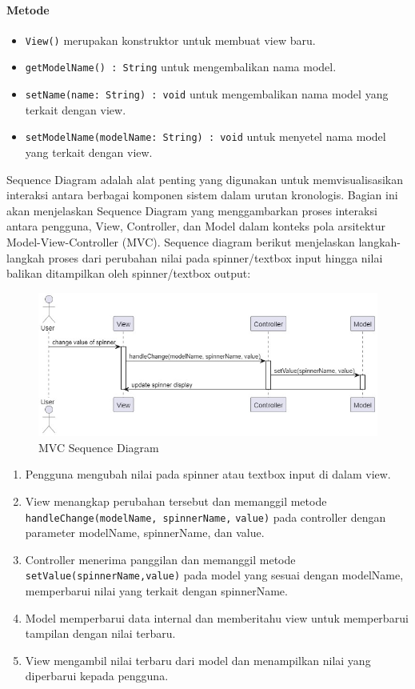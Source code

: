 \documentclass[conference]{IEEEtran}
\begin{document}
\paragraph{Metode} 
\begin{itemize}
\item \verb |View()| merupakan konstruktor untuk membuat view baru.
\item \verb |getModelName() : String| untuk mengembalikan nama model. 
\item \verb |setName(name: String) : void| untuk mengembalikan nama model yang terkait dengan view.
\item \verb |setModelName(modelName: String) : void| untuk menyetel nama model yang terkait dengan view.\\
\end{itemize}

Sequence Diagram adalah alat penting yang digunakan untuk memvisualisasikan interaksi antara berbagai komponen sistem dalam urutan kronologis. Bagian ini akan menjelaskan Sequence Diagram yang menggambarkan proses interaksi antara pengguna, View, Controller, dan Model dalam konteks pola arsitektur Model-View-Controller (MVC). Sequence diagram berikut menjelaskan langkah-langkah proses dari perubahan nilai pada spinner/textbox input hingga nilai balikan ditampilkan oleh spinner/textbox output:

\begin{figure}[h]
    \centering
    \includegraphics[width=0.8\linewidth]{image.png}
    \caption{MVC Sequence Diagram}
    \label{fig:enter-label}
\end{figure}

\begin{enumerate}
    \item Pengguna mengubah nilai pada spinner atau textbox input di dalam view.
    \item View menangkap perubahan tersebut dan memanggil metode \verb |handleChange(modelName, spinnerName,| \verb |value)| pada controller dengan parameter modelName, spinnerName, dan value.
    \item Controller menerima panggilan dan memanggil metode \verb |setValue(spinnerName,value)| pada model yang sesuai dengan modelName, memperbarui nilai yang terkait dengan spinnerName.
    \item Model memperbarui data internal dan memberitahu view untuk memperbarui tampilan dengan nilai terbaru.
    \item View mengambil nilai terbaru dari model dan menampilkan nilai yang diperbarui kepada pengguna.\\ 
\end{enumerate}
\end{document}
